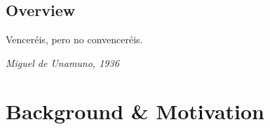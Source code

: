 
\frontmatter %


\pagestyle{pagenum.scrheadings}















\printglossary[
	type=\acronymtype,
    title=Acronyms, 
    toctitle=Acronyms
] 


\mainmatter%



\setchapterpreamble[u]{\margintoc}
\chapter{Overview}\label{chap:overview}
\vspace{-\baselineskip}
\setlength{\epigraphwidth}{.4\linewidth}
\epigraph{
	Vencer\'eis, pero no convencer\'eis.
}{\textit{Miguel de Unamuno, 1936}}



\part{Background \& Motivation}\label{part:background}

\setchapterpreamble[u]{\margintoc}
